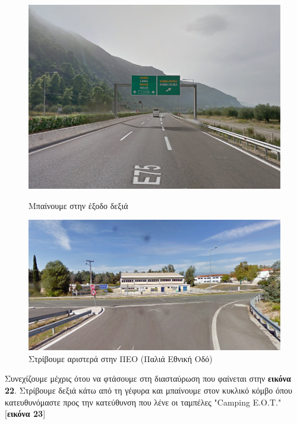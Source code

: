\begin{figure}[H]
	\centering
		\includegraphics[width=\textwidth]{images/athina-lamia/lamia/lamia1.PNG}
			\caption{Μπαίνουμε στην έξοδο δεξιά}

	\centering
		\includegraphics[width=\textwidth]{images/athina-lamia/lamia/lamia2.PNG}
			\caption{Στρίβουμε αριστερά στην ΠΕΟ (Παλιά Εθνική Οδό)}
\end{figure}
Συνεχίζουμε μέχρις ότου να φτάσουμε στη διασταύρωση που φαίνεται στην \textbf{εικόνα 22}. Στρίβουμε δεξιά κάτω από τη γέφυρα και μπαίνουμε στον κυκλικό κόμβο όπου κατευθυνόμαστε προς την κατεύθυνση που λένε οι ταμπέλες "Camping Ε.Ο.Τ." [\textbf{εικόνα 23}]
